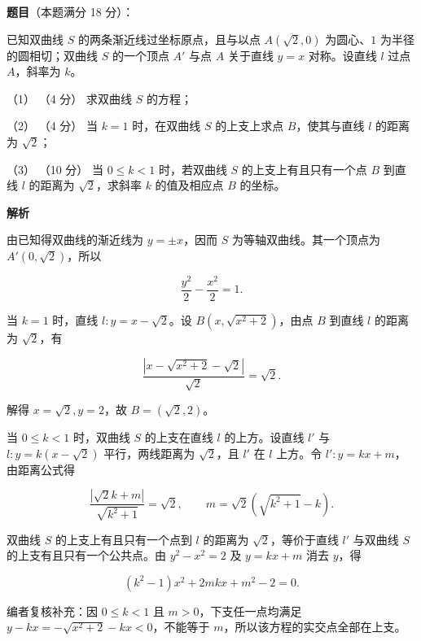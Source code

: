 \begin{answer}

\textbf{题目}（本题满分 18 分）：

已知双曲线 $S$ 的两条渐近线过坐标原点，且与以点 $A(\sqrt2,0)$ 为圆心、$1$ 为半径的圆相切；双曲线 $S$ 的一个顶点 $A'$ 与点 $A$ 关于直线 $y=x$ 对称。设直线 $l$ 过点 $A$，斜率为 $k$。

（1） （4 分） 求双曲线 $S$ 的方程；

（2） （4 分） 当 $k=1$ 时，在双曲线 $S$ 的上支上求点 $B$，使其与直线 $l$ 的距离为 $\sqrt2$；

（3） （10 分） 当 $0\le k<1$ 时，若双曲线 $S$ 的上支上有且只有一个点 $B$ 到直线 $l$ 的距离为 $\sqrt2$，求斜率 $k$ 的值及相应点 $B$ 的坐标。
\nopagebreak[4]
\begin{center}\end{center}
\nopagebreak[4]
\textbf{解析}


由已知得双曲线的渐近线为 $y=\pm x$，因而 $S$ 为等轴双曲线。其一个顶点为 $A'(0,\sqrt2)$，所以

\nopagebreak[4]
\[
\dfrac{y^2}{2}-\dfrac{x^2}{2}=1.
\]


当 $k=1$ 时，直线 $l:y=x-\sqrt2$。设 $B(x,\sqrt{x^2+2})$，由点 $B$ 到直线 $l$ 的距离为 $\sqrt2$，有

\nopagebreak[4]
\[
\dfrac{|x-\sqrt{x^2+2}-\sqrt2|}{\sqrt2}=\sqrt2.
\]

解得 $x=\sqrt2,y=2$，故 $B=(\sqrt2,2)$。


当 $0\le k<1$ 时，双曲线 $S$ 的上支在直线 $l$ 的上方。设直线 $l'$ 与 $l:y=k(x-\sqrt2)$ 平行，两线距离为 $\sqrt2$，且 $l'$ 在 $l$ 上方。令 $l':y=kx+m$，由距离公式得

\nopagebreak[4]
\[
\dfrac{|\sqrt2k+m|}{\sqrt{k^2+1}}=\sqrt2,
\qquad m=\sqrt2\left(\sqrt{k^2+1}-k\right).
\]

双曲线 $S$ 的上支上有且只有一个点到 $l$ 的距离为 $\sqrt2$，等价于直线 $l'$ 与双曲线 $S$ 的上支有且只有一个公共点。由 $y^2-x^2=2$ 及 $y=kx+m$ 消去 $y$，得

\nopagebreak[4]
\[
(k^2-1)x^2+2mkx+m^2-2=0.
\]

编者复核补充：因 $0\le k<1$ 且 $m>0$，下支任一点均满足 $y-kx=-\sqrt{x^2+2}-kx<0$，不能等于 $m$，所以该方程的实交点全部在上支。


\end{answer}

